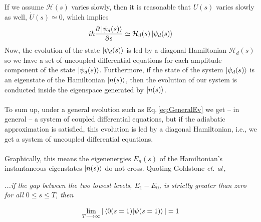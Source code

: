 If we assume $\mathcal{H}(s)$ varies slowly, then it is reasonable that $U(s)$ varies slowly as well, $\dot{U}(s) \simeq 0$, which implies
\begin{equation}
    i\hbar  \frac{\partial \ket{\psi_{d}(s)}}{\partial s} \simeq \mathcal{H}_{d}(s)\ket{\psi_{d}(s)}
\end{equation}
Now, the evolution of the state $\ket{\psi_{d}(s)}$ is led by a diagonal Hamiltonian $\mathcal{H}_{d}(s)$ so we have a set of uncoupled differential equations for each amplitude component of the state $\ket{\psi_{d}(s)}$. Furthermore, if the state of the system $\ket{\psi_{d}(s)}$ is an eigenstate of the Hamiltonian $\ket{n(s)}$, then the evolution of our system is conducted inside the eigenspace generated by $\ket{n(s)}$.\\\\
To sum up, under a general evolution such as Eq.\,\eqref{eq:GeneralEv} we get -- in general -- a system of coupled differential equations, but if the adiabatic approximation is satisfied, this evolution is led by a diagonal Hamiltonian, i.e., we get a system of uncoupled differential equations.\\\\
Graphically, this means the eigenenergies $E_{n}(s)$ of the Hamiltonian's instantaneous eigenstates $\ket{n(s)}$ do not cross.
Quoting Goldstone \textit{et. al}\,\cite{Farhi2000QuantumEvolution},
\begin{displayquote}
\textit{...if the gap between the two lowest levels, $E_{1} - E_{0}$, is strictly greater than zero for all $0 \leq s \leq T$, then}
\end{displayquote}
\begin{equation}
    \lim_{T\longrightarrow \infty} | \braket{0(s=1) | \psi(s=1)}| = 1
\end{equation}
